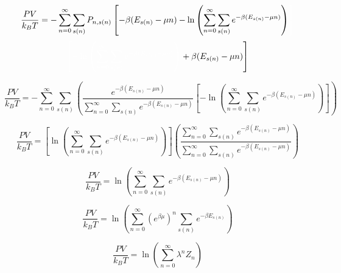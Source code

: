 \documentclass[double,12pt]{beavtex}
\begin{document}
\begin{equation}
   \frac{PV}{k_BT}=-\sum_{n=0}^\infty\sum_{s(n)}P_{n,s(n)}\left[-\beta(E_{s(n)}-\mu{n})-\ln{\left(\sum_{n=0}^\infty\sum_{s(n)}e^{-\beta(E_{s(n)}-\mu{n})}\right)}\color{white}\right]\color{black} \nonumber
\end{equation}
\begin{equation}
   \color{white}\left[-\ln{\left(\sum_{n=0}^\infty\sum_{s(n)}e^{-\beta(E_{s(n)}-\mu{n})}\right)}\color{black}+\beta(E_{s(n)}-\mu{n})\right]\color{black}
\end{equation}

\begin{equation}\frac{PV}{k_BT}=-\sum_{n=0}^\infty\sum_{s(n)}\left(\frac{e^{-\beta(E_{s(n)}-\mu{n})}}{\sum_{n=0}^\infty\sum_{s(n)}e^{-\beta(E_{s(n)}-\mu{n})}} \left[-\ln{\left(\sum_{n=0}^\infty\sum_{s(n)}e^{-\beta(E_{s(n)}-\mu{n})}\right)}\right]\right)\end{equation}

\begin{equation}\frac{PV}{k_BT}=\left[\ln{\left(\sum_{n=0}^\infty\sum_{s(n)}e^{-\beta(E_{s(n)}-\mu{n})}\right)}\right]\left(\frac{\sum_{n=0}^\infty\sum_{s(n)}e^{-\beta(E_{s(n)}-\mu{n})}}{\sum_{n=0}^\infty\sum_{s(n)}e^{-\beta(E_{s(n)}-\mu{n})}}\right) \end{equation}

\begin{equation}\frac{PV}{k_BT}=\ln{\left(\sum_{n=0}^\infty\sum_{s(n)}e^{-\beta(E_{s(n)}-\mu{n})}\right)} \end{equation}

\begin{equation}\frac{PV}{k_BT}=\ln{\left(\sum_{n=0}^\infty \left(e^{\beta\mu}\right)^n\sum_{s(n)}e^{-\beta{E}_{s(n)}}\right)} \end{equation}

\begin{equation}\frac{PV}{k_BT}=\ln{\left(\sum_{n=0}^\infty \lambda^nZ_n\right)} \end{equation}
\end{document}
